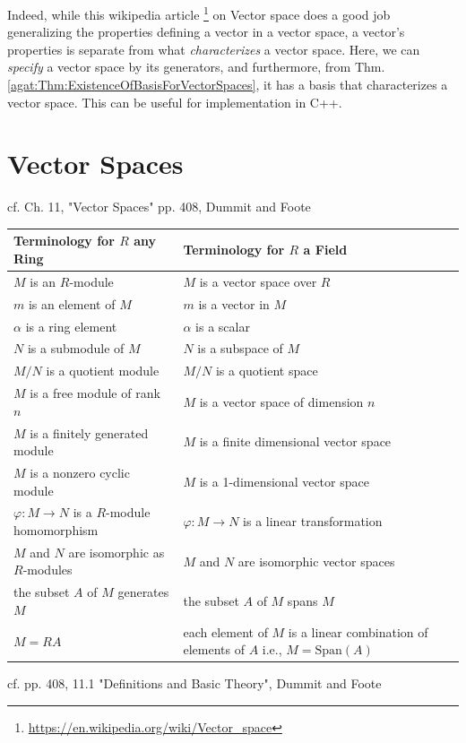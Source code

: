Indeed, while this wikipedia article \footnote{\url{https://en.wikipedia.org/wiki/Vector_space}} on Vector space does a good job generalizing the properties defining a vector in a vector space, a vector's properties is separate from what \emph{characterizes} a vector space. Here, we can \emph{specify} a vector space by its generators, and furthermore, from Thm. \ref{agat:Thm:ExistenceOfBasisForVectorSpaces}, it has a basis that characterizes a vector space. This can be useful for implementation in C++.

\section{Vector Spaces}

cf. Ch. 11, "Vector Spaces" pp. 408, Dummit and Foote \cite{agat:DuFo2003}

\begin{center}
\begin{tabular}{l | l }
\textbf{Terminology for $R$ any Ring} & \textbf{Terminology for $R$ a Field } \\
\hline
$M$ is an $R$-module & $M$ is a vector space over $R$ \\
$m$ is an element of $M$ & $m$ is a vector in $M$ \\
$\alpha$ is a ring element & $\alpha$ is a scalar \\
$N$ is a submodule of $M$ & $N$ is a subspace of $M$ \\
$M/N$ is a quotient module & $M/N$ is a quotient space \\
$M$ is a free module of rank $n$ & $M$ is a vector space of dimension $n$ \\
$M$ is a finitely generated module & $M$ is a finite dimensional vector space \\
$M$ is a nonzero cyclic module & $M$ is a 1-dimensional vector space \\
$\varphi : M \to N$ is a $R$-module homomorphism & $\varphi : M \to N$ is a linear transformation \\
$M$ and $N$ are isomorphic as $R$-modules & $M$ and $N$ are isomorphic vector spaces \\
the subset $A$ of $M$ generates $M$ & the subset $A$ of $M$ spans $M$ \\
$M = RA$ & each element of $M$ is a linear combination of elements of $A$ i.e., $M=\text{Span}(A)$
\end{tabular} 
\end{center}
cf. pp. 408, 11.1 "Definitions and Basic Theory", Dummit and Foote \cite{agat:DuFo2003}

